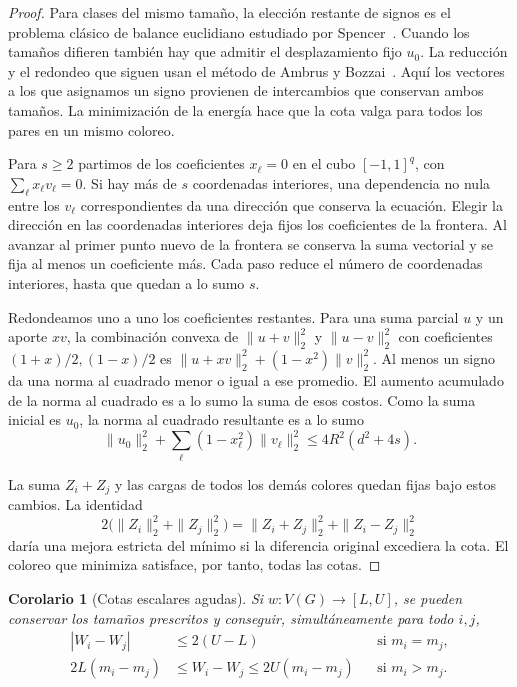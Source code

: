 \documentclass[11pt]{article}
\newtheorem{corollary}[theorem]{Corolario}
\begin{document}
\begin{proof}
Para clases del mismo tamaño, la elección restante de signos es el problema clásico de balance euclidiano estudiado por Spencer~\cite{Spencer}. Cuando los tamaños difieren también hay que admitir el desplazamiento fijo \(u_0\). La reducción y el redondeo que siguen usan el método de Ambrus y Bozzai~\cite[Sección~2 y Proposición~3.1]{AB}. Aquí los vectores a los que asignamos un signo provienen de intercambios que conservan ambos tamaños. La minimización de la energía hace que la cota valga para todos los pares en un mismo coloreo.

Para \(s\ge2\) partimos de los coeficientes \(x_\ell=0\) en el cubo \([-1,1]^q\), con \(\sum_\ell x_\ell v_\ell=0\). Si hay más de \(s\) coordenadas interiores, una dependencia no nula entre los \(v_\ell\) correspondientes da una dirección que conserva la ecuación. Elegir la dirección en las coordenadas interiores deja fijos los coeficientes de la frontera. Al avanzar al primer punto nuevo de la frontera se conserva la suma vectorial y se fija al menos un coeficiente más. Cada paso reduce el número de coordenadas interiores, hasta que quedan a lo sumo \(s\).

Redondeamos uno a uno los coeficientes restantes. Para una suma parcial \(u\) y un aporte \(xv\), la combinación convexa de \(\|u+v\|_2^2\) y \(\|u-v\|_2^2\) con coeficientes \((1+x)/2,(1-x)/2\) es \(\|u+xv\|_2^2+(1-x^2)\|v\|_2^2\). Al menos un signo da una norma al cuadrado menor o igual a ese promedio. El aumento acumulado de la norma al cuadrado es a lo sumo la suma de esos costos. Como la suma inicial es \(u_0\), la norma al cuadrado resultante es a lo sumo
\[
  \|u_0\|_2^2+\sum_\ell(1-x_\ell^2)\|v_\ell\|_2^2
  \le 4R^2(d^2+4s).
\]

La suma \(Z_i+Z_j\) y las cargas de todos los demás colores quedan fijas bajo estos cambios. La identidad
\[
  2\bigl(\|Z_i\|_2^2+\|Z_j\|_2^2\bigr)
    =\|Z_i+Z_j\|_2^2+\|Z_i-Z_j\|_2^2
\]
daría una mejora estricta del mínimo si la diferencia original excediera la cota. El coloreo que minimiza satisface, por tanto, todas las cotas.
\end{proof}

\begin{corollary}[Cotas escalares agudas]\label{cor:scalar}
Si \(w:V(G)\to[L,U]\), se pueden conservar los tamaños prescritos y conseguir, simultáneamente para todo \(i,j\),
\[
\begin{aligned}
 |W_i-W_j|&\le2(U-L) &&\text{si }m_i=m_j,\\
 2L(m_i-m_j)&\le W_i-W_j\le2U(m_i-m_j)
       &&\text{si }m_i>m_j.
\end{aligned}
\]
\end{corollary}
\end{document}
